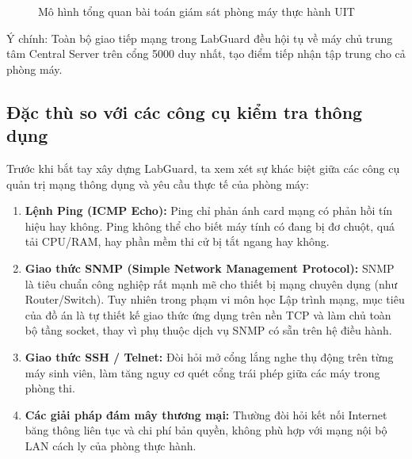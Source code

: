 \documentclass[12pt,a4paper]{article}
\begin{document}
\begin{figure}[H]
{
}
  \caption{Mô hình tổng quan bài toán giám sát phòng máy thực hành UIT}
  \label{fig:labguard_overview_problem}
\end{figure}

Ý chính: Toàn bộ giao tiếp mạng trong LabGuard đều hội tụ về máy chủ trung tâm Central Server trên cổng 5000 duy nhất, tạo điểm tiếp nhận tập trung cho cả phòng máy.

\subsection{Đặc thù so với các công cụ kiểm tra thông dụng}
Trước khi bắt tay xây dựng LabGuard, ta xem xét sự khác biệt giữa các công cụ quản trị mạng thông dụng và yêu cầu thực tế của phòng máy:
\begin{enumerate}
  \item \textbf{Lệnh Ping (ICMP Echo):} Ping chỉ phản ánh card mạng có phản hồi tín hiệu hay không. Ping không thể cho biết máy tính có đang bị đơ chuột, quá tải CPU/RAM, hay phần mềm thi cử bị tắt ngang hay không.
  \item \textbf{Giao thức SNMP (Simple Network Management Protocol):} SNMP là tiêu chuẩn công nghiệp rất mạnh mẽ cho thiết bị mạng chuyên dụng (như Router/Switch). Tuy nhiên trong phạm vi môn học Lập trình mạng, mục tiêu của đồ án là tự thiết kế giao thức ứng dụng trên nền TCP và làm chủ toàn bộ tầng socket, thay vì phụ thuộc dịch vụ SNMP có sẵn trên hệ điều hành.
  \item \textbf{Giao thức SSH / Telnet:} Đòi hỏi mở cổng lắng nghe thụ động trên từng máy sinh viên, làm tăng nguy cơ quét cổng trái phép giữa các máy trong phòng thi.
  \item \textbf{Các giải pháp đám mây thương mại:} Thường đòi hỏi kết nối Internet băng thông liên tục và chi phí bản quyền, không phù hợp với mạng nội bộ LAN cách ly của phòng thực hành.
\end{enumerate}
\end{document}
